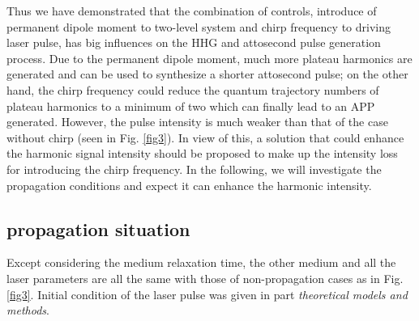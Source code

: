 \documentclass[10pt,letterpaper]{article}
\begin{document}
Thus we have demonstrated that the combination of controls, introduce of permanent dipole moment to two-level system and chirp frequency to driving laser pulse, has big influences on the HHG and attosecond pulse generation process. Due to the permanent dipole moment, much more plateau harmonics are generated and can be used to synthesize a shorter attosecond pulse; on the other hand, the chirp frequency could reduce the quantum trajectory numbers of plateau harmonics to a minimum of two which can finally lead to an APP generated. However, the pulse intensity is much weaker than that of the case without chirp (seen in Fig. \ref{fig3}). In view of this, a solution that could enhance the harmonic signal intensity should be proposed to make up the intensity loss for introducing the chirp frequency. In the following, we will investigate the propagation conditions and expect it can enhance the harmonic intensity. 
\subsection{propagation situation}
Except considering the medium relaxation time, the other medium and all the laser parameters are all the same with those of non-propagation cases as in Fig. \ref{fig3}. Initial condition of the laser pulse was given in part \emph{theoretical models and methods}. 
\end{document}

